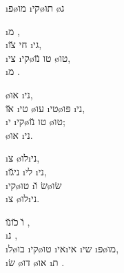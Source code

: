 \textheader%
{\i{פ}\o{מו} \i{קי}\o{תו}}
{ \o{ג}}
{}
{}
{}
{}
{}

\begin{twocol}
\begin{stanza}
  \i{מ} ,\\
\i{חי}  \u{צו} \i{גי},\\
\i{צי} \i{קי}\o{טו} \u{נו} \o{טו},\\
  \i{מ} .
\end{stanza}

\begin{stanza}
\o{או}  \i{ני},\\
\u{או} \i{טי} \o{עו} \i{טי}\o{פּו} \i{ני},\\
\i{י} \i{קי}\o{טו} \u{נו} \o{טו};\\
 \o{או}  \i{ני}.
\end{stanza}

\begin{stanza}
  \i{צ} \o{לו}\i{ני},\\
 \i{ני}\u{גו} \i{לי}  \i{ני},\\
 \i{קי}\o{טו} \i{שׂ} \u{ו}\o{שׂו}\\
  \i{צ} \o{לו}\i{ני}.
\end{stanza}

\begin{stanza}
\u{ו}  \u{כו}\u{נו}  ,\\
\i{נ}    ,\\
\i{ל}\o{בו} \i{קי}\o{טו} \i{אי}\i{אי} \i{שי}  \i{פּ}\o{מו},\\
\i{שׂ} \o{דו} \o{או} \i{ת} .
\end{stanza}
\end{twocol}
